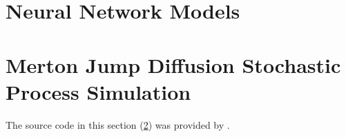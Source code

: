 \documentclass[11pt,oneside,openany,a4paper,english, report, goldenblock
]{usthesis}
\begin{document}
\section{Neural Network Models}


\newpage
\section{Merton Jump Diffusion Stochastic Process Simulation}
\label{appendix:source_code:merton_simulation}
The source code in this section (\ref{appendix:source_code:merton_simulation}) was provided by \cite{reid}.

\end{document}
